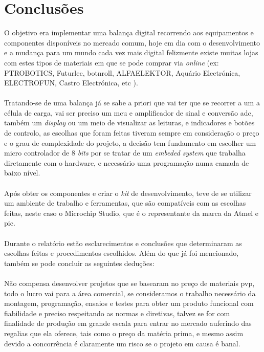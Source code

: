 \chapter{Conclusões}
O objetivo era implementar uma balança digital recorrendo aos equipamentos e componentes disponíveis no mercado comum, hoje em dia com o desenvolvimento e a mudança para um mundo cada vez mais digital felizmente existe muitas lojas com estes tipos de materiais em que se pode comprar via \textit{online} (ex: PTROBOTICS, Futurlec, botnroll, ALFAELEKTOR, Aquário Electrónica, ELECTROFUN, Castro Electrónica, etc ).
\\
\\
Tratando-se de uma balança já se sabe a priori que vai ter que se recorrer a um a célula de carga, vai ser preciso um \acs{mcu} e amplificador de sinal e conversão \acs{adc}, também um \textit{display} ou um meio de visualizar as leituras, e indicadores e botões de controlo, as escolhas que foram feitas tiveram sempre em consideração o preço e o grau de complexidade do projeto, a decisão tem fundamento em escolher um micro controlador de 8 \textit{bits} por se tratar de um \textit{embeded system} que trabalha diretamente com o hardware, e necessário uma programação numa camada de baixo nível.
\\
\\
Após obter os componentes e criar o \textit{kit} de desenvolvimento, teve de se utilizar um ambiente de trabalho e ferramentas, que são compatíveis com as escolhas feitas, neste caso o Microchip Studio, que é o representante da marca da Atmel e \acs{pic}.
\\
\\
Durante o relatório estão esclarecimentos e conclusões que determinaram as escolhas feitas e procedimentos escolhidos. Além do que já foi mencionado, também se pode concluir as seguintes deduções:
\\
\\
Não compensa desenvolver projetos que se basearam no preço de materiais \ac{pvp}, todo o lucro vai para a área comercial, se consideramos o trabalho necessário da montagem, programação, ensaios e testes para obter um produto funcional com fiabilidade e preciso respeitando as normas e diretivas, talvez se for com finalidade de produção em grande escala para entrar no mercado auferindo das regalias que ela oferece, tais como o preço da matéria prima, e mesmo assim devido a concorrência é claramente um risco se o projeto em causa é banal.
